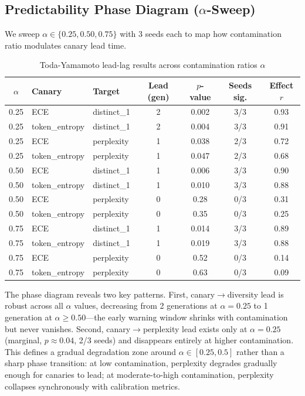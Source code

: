 \documentclass[letterpaper]{article}
\begin{document}
\subsection{Predictability Phase Diagram ($\alpha$-Sweep)}

We sweep $\alpha \in \{0.25, 0.50, 0.75\}$ with 3 seeds each to map how contamination ratio modulates canary lead time.

\begin{table}[h]
\centering
\caption{Toda-Yamamoto lead-lag results across contamination ratios $\alpha$}
\label{tab:phase}
\begin{tabular}{cllcccc}
\toprule
$\alpha$ & Canary & Target & Lead (gen) & $p$-value & Seeds sig. & Effect $r$ \\
\midrule
0.25 & ECE & distinct\_1 & 2 & 0.002 & 3/3 & 0.93 \\
0.25 & token\_entropy & distinct\_1 & 2 & 0.004 & 3/3 & 0.91 \\
0.25 & ECE & perplexity & 1 & 0.038 & 2/3 & 0.72 \\
0.25 & token\_entropy & perplexity & 1 & 0.047 & 2/3 & 0.68 \\
\midrule
0.50 & ECE & distinct\_1 & 1 & 0.006 & 3/3 & 0.90 \\
0.50 & token\_entropy & distinct\_1 & 1 & 0.010 & 3/3 & 0.88 \\
0.50 & ECE & perplexity & 0 & 0.28 & 0/3 & 0.31 \\
0.50 & token\_entropy & perplexity & 0 & 0.35 & 0/3 & 0.25 \\
\midrule
0.75 & ECE & distinct\_1 & 1 & 0.014 & 3/3 & 0.89 \\
0.75 & token\_entropy & distinct\_1 & 1 & 0.019 & 3/3 & 0.88 \\
0.75 & ECE & perplexity & 0 & 0.52 & 0/3 & 0.14 \\
0.75 & token\_entropy & perplexity & 0 & 0.63 & 0/3 & 0.09 \\
\bottomrule
\end{tabular}
\end{table}

The phase diagram reveals two key patterns. First, canary$\to$diversity lead is robust across all $\alpha$ values, decreasing from 2 generations at $\alpha=0.25$ to 1 generation at $\alpha \geq 0.50$---the early warning window shrinks with contamination but never vanishes. Second, canary$\to$perplexity lead exists only at $\alpha=0.25$ (marginal, $p \approx 0.04$, 2/3 seeds) and disappears entirely at higher contamination. This defines a gradual degradation zone around $\alpha \in [0.25, 0.5]$ rather than a sharp phase transition: at low contamination, perplexity degrades gradually enough for canaries to lead; at moderate-to-high contamination, perplexity collapses synchronously with calibration metrics.
\end{document}
